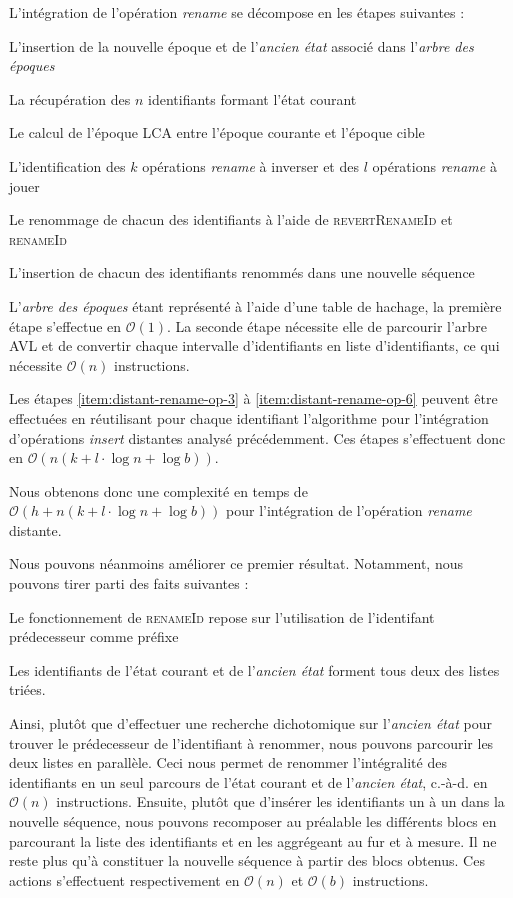\documentclass[12pt]{thesul}
\newcommand{\ie}{c.-à-d. }
\newcommand\bigO[1]{$\mathcal{O}(#1)$}
\begin{document}
L'intégration de l'opération \emph{rename} se décompose en les étapes suivantes :
\begin{enumerate*}[label=(\roman*)]
  \item L'insertion de la nouvelle époque et de l'\emph{ancien état} associé dans l'\emph{arbre des époques}
  \item La récupération des $n$ identifiants formant l'état courant
  \item \label{item:distant-rename-op-3} Le calcul de l'époque \ac{LCA} entre l'époque courante et l'époque cible
  \item L'identification des $k$ opérations \emph{rename} à inverser et des $l$ opérations \emph{rename} à jouer
  \item Le renommage de chacun des identifiants à l'aide de \textsc{revertRenameId} et \textsc{renameId}
  \item \label{item:distant-rename-op-6} L'insertion de chacun des identifiants renommés dans une nouvelle séquence
\end{enumerate*}
L'\emph{arbre des époques} étant représenté à l'aide d'une table de hachage, la première étape s'effectue en \bigO{1}.
La seconde étape nécessite elle de parcourir l'arbre AVL et de convertir chaque intervalle d'identifiants en liste d'identifiants, ce qui nécessite \bigO{n} instructions.

Les étapes \ref{item:distant-rename-op-3} à \ref{item:distant-rename-op-6} peuvent être effectuées en réutilisant pour chaque identifiant l'algorithme pour l'intégration d'opérations \emph{insert} distantes analysé précédemment.
Ces étapes s'effectuent donc en \bigO{n(k + l \cdot \log{}n + \log{}b)}.

Nous obtenons donc une complexité en temps de \bigO{h + n(k + l \cdot \log{}n + \log{}b)} pour l'intégration de l'opération \emph{rename} distante.

Nous pouvons néanmoins améliorer ce premier résultat.
Notamment, nous pouvons tirer parti des faits suivantes :
\begin{enumerate*}[label=(\roman*)]
  \item Le fonctionnement de \textsc{renameId} repose sur l'utilisation de l'identifant prédecesseur comme préfixe
  \item Les identifiants de l'état courant et de l'\emph{ancien état} forment tous deux des listes triées.
\end{enumerate*}
Ainsi, plutôt que d'effectuer une recherche dichotomique sur l'\emph{ancien état} pour trouver le prédecesseur de l'identifiant à renommer, nous pouvons parcourir les deux listes en parallèle.
Ceci nous permet de renommer l'intégralité des identifiants en un seul parcours de l'état courant et de l'\emph{ancien état}, \ie en \bigO{n} instructions.
Ensuite, plutôt que d'insérer les identifiants un à un dans la nouvelle séquence, nous pouvons recomposer au préalable les différents blocs en parcourant la liste des identifiants et en les aggrégeant au fur et à mesure.
Il ne reste plus qu'à constituer la nouvelle séquence à partir des blocs obtenus.
Ces actions s'effectuent respectivement en \bigO{n} et \bigO{b} instructions.
\end{document}
